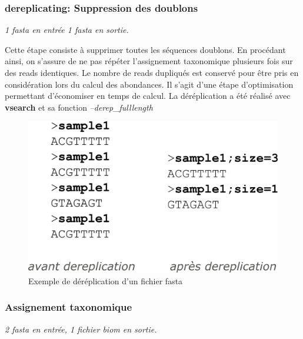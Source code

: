 \documentclass[12pt,a4paper]{article}
\begin{document}
\subsubsection{dereplicating: Suppression des doublons}\begin{center}\emph{1 fasta en entrée 1 fasta en sortie. } \end{center}

Cette étape consiste à supprimer toutes les séquences doublons. En procédant ainsi, on s'assure de ne pas répéter l'assignement taxonomique plusieurs fois sur des reads identiques. Le nombre de reads dupliqués est conservé pour être pris en considération lors du calcul des abondances. Il s'agit d'une étape d'optimisation permettant d'économiser en temps de calcul. La déréplication a été réalisé avec \textbf{vsearch} et sa fonction \textit{--derep\_fulllength }

\begin{figure}[ht]
\begin{center}
\includegraphics[scale=0.4]{img/dereplication.png}\hfill
\end{center}
\caption{Exemple de déréplication d'un fichier fasta}
\label{dereplication}
\end{figure}

\subsubsection{Assignement taxonomique} \begin{center}\emph{2 fasta en entrée,  1 fichier biom  en sortie. }\end{center} 
\end{document}
